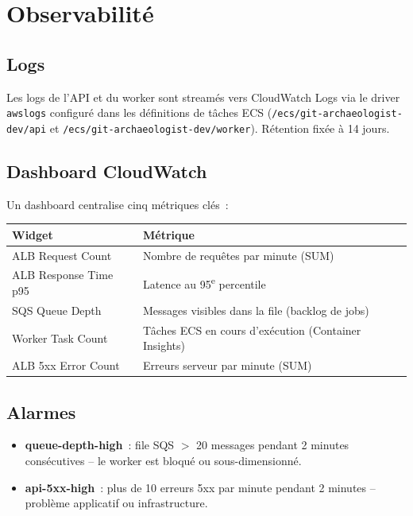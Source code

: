 \documentclass[11pt,a4paper]{article}
\newcommand{\code}[1]{\texttt{#1}}
\begin{document}
\section{Observabilit\'{e}}

\subsection{Logs}

Les logs de l'API et du worker sont stream\'{e}s vers CloudWatch Logs via le driver \code{awslogs} configur\'{e} dans les d\'{e}finitions de t\^{a}ches ECS (\code{/ecs/git-archaeologist-dev/api} et \code{/ecs/git-archaeologist-dev/worker}). R\'{e}tention fix\'{e}e \`{a} 14 jours.

\subsection{Dashboard CloudWatch}

Un dashboard centralise cinq m\'{e}triques cl\'{e}s~:

\begin{tabularx}{\linewidth}{lX}
\toprule
Widget & M\'{e}trique \\
\midrule
ALB Request Count & Nombre de requ\^{e}tes par minute (SUM) \\
ALB Response Time p95 & Latence au 95\textsuperscript{e} percentile \\
SQS Queue Depth & Messages visibles dans la file (backlog de jobs) \\
Worker Task Count & T\^{a}ches ECS en cours d'ex\'{e}cution (Container Insights) \\
ALB 5xx Error Count & Erreurs serveur par minute (SUM) \\
\bottomrule
\end{tabularx}

\subsection{Alarmes}

\begin{itemize}[noitemsep]
  \item \textbf{queue-depth-high}~: file SQS $>$ 20 messages pendant 2 minutes cons\'{e}cutives -- le worker est bloqu\'{e} ou sous-dimensionn\'{e}.
  \item \textbf{api-5xx-high}~: plus de 10 erreurs 5xx par minute pendant 2 minutes -- probl\`{e}me applicatif ou infrastructure.
\end{itemize}
\end{document}
